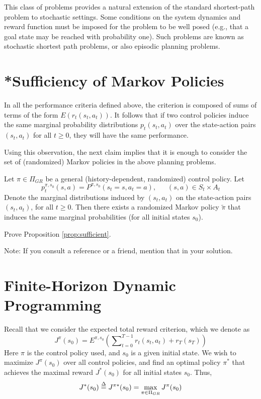 This class of problems provides a natural extension of the standard shortest-path problem to stochastic settings.  Some conditions on the system dynamics and reward function must be imposed for the problem to be well posed (e.g., that a goal state may be reached  with probability one).
Such problems are known as stochastic shortest path problems, or also episodic planning problems.

\section{*Sufficiency of Markov Policies}
In all the performance criteria defined above, the criterion is composed of sums of terms of the form $E({r_t}({s_t},{a_t}))$. It follows that if two control policies induce the same marginal probability distributions ${p_t}({s_t},{a_t})$ over the state-action pairs $({s_t},{a_t})$ for all $t \ge 0$, they will have the same performance.

Using this observation, the next claim implies that it is enough to consider the set of (randomized) Markov policies in the above planning problems.

\begin{proposition}\label{prop:sufficient} Let  $\pi  \in {\Pi _{GR}}$ be a general (history-dependent, randomized) control policy.  Let
\[p_t^{\pi ,{s_0}}(s,a) = {P^{\pi ,{s_0}}}({s_t} = s,{a_t} = a),\quad \;\;(s,a) \in {S_t} \times {A_t}\]
Denote the marginal distributions induced by $({s_t},{a_t})$ on the state-action pairs $({s_t},{a_t})$, for all $t \ge 0$.
Then there exists a randomized Markov policy $\tilde \pi $ that induces the same marginal probabilities (for all initial states ${s_0}$).
\end{proposition}
\begin{exercise} Prove Proposition \ref{prop:sufficient}.

Note: If you consult a reference or a friend, mention that in your solution.
\end{exercise}


\section{Finite-Horizon Dynamic Programming}

Recall that we consider the expected total reward criterion, which we denote as
\[{J^\pi }({s_0}) = {E^{\pi ,{s_0}}}\left( {\sum\nolimits_{t = 0}^{T - 1} {{r_t}({s_t},{a_t}) + {r_T}({s_T})} } \right)\]
Here $\pi $ is the control policy used, and ${s_0}$ is a given initial state. We wish to maximize ${J^\pi }({s_0})$ over all control policies, and find an optimal policy ${\pi ^*}$ that achieves the maximal reward ${J^*}({s_0})$ for all initial states ${s_0}$.  Thus,
\[{J^*}({s_0}) \buildrel \Delta \over = {J^{\pi *}}({s_0}) = \mathop {\max }\limits_{\pi  \in {\Pi _{GR}}} {J^\pi }({s_0})\]


